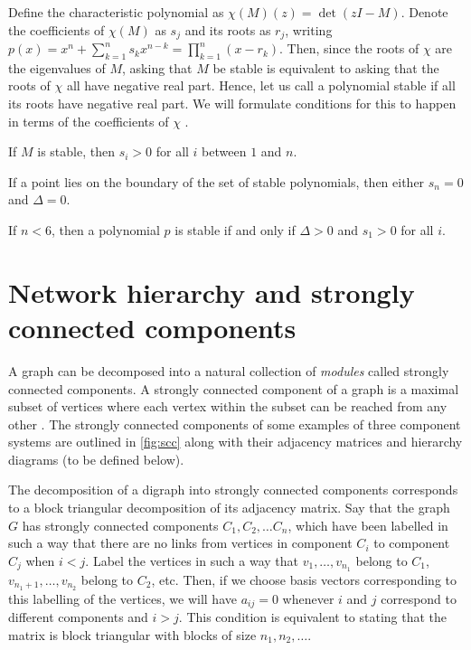 Define the characteristic polynomial as $\chi(M)(z) = \det(zI - M)$.
Denote the coefficients of $\chi(M)$ as $s_j$ and its roots as $r_j$,
writing $p(x) = x^n + \sum_{k=1}^n s_k x^{n-k} = \prod_{k=1}^n (x-r_k)$.
Then, since the roots of $\chi$ are the eigenvalues of $M$, asking that
$M$ be stable is equivalent to asking that the roots of $\chi$ all have
negative real part.  Hence, let us call a polynomial stable if all its
roots have negative real part.  We will formulate conditions for this to
happen in terms of the coefficients of $\chi$ \cite{Gantmacher1959}.

\begin{lemma}
If $M$ is stable, then $s_i > 0$ for all $i$ between $1$ and $n$.
\end{lemma}
\begin{lemma}
If a point lies on the boundary of the set of stable polynomials, then
either $s_n = 0$ and $\Delta = 0$.
\end{lemma}
\begin{lemma}
If $n < 6$, then a polynomial $p$ is stable if and only
if $\Delta > 0$ and $s_1 > 0$ for all $i$.
\end{lemma}

\section{Network hierarchy and strongly connected components}

A graph can be decomposed into a natural collection of \emph{modules} called strongly connected components. A strongly connected component of a graph is a maximal subset of vertices where each vertex within the subset can be reached from any other \cite{Cormen2009}. The strongly connected components of some examples of three component systems are outlined in \ref{fig:scc} along with their adjacency matrices and hierarchy diagrams (to be defined below).

The decomposition of a digraph into strongly connected components corresponds to a block triangular decomposition of its adjacency matrix.  Say that the graph $G$ has strongly connected components $C_1, C_2, \ldots C_n$, which have been labelled in such a way that there are no links from vertices in component $C_i$ to component $C_j$ when $i < j$.  Label the vertices in such a way that $v_1, \ldots, v_{n_1}$ belong to $C_1$, $v_{n_1 + 1}, \ldots, v_{n_2}$ belong to $C_2$, etc.  Then, if we choose basis vectors corresponding to this labelling of the vertices, we will have $a_{ij} = 0$ whenever $i$ and $j$ correspond to different components and $i > j$.  This condition is equivalent to stating that the matrix is block triangular with blocks of size $n_1, n_2, \ldots$.

